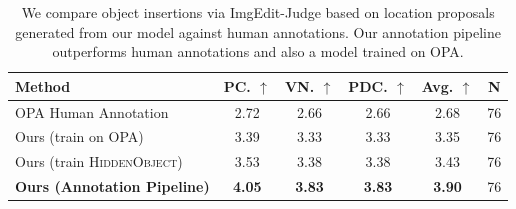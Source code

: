 
\begin{table}[t]
\label{tab:inpainting_performance}
\centering
\caption{We compare object insertions via ImgEdit-Judge based on location proposals generated from our model against human annotations. Our annotation pipeline outperforms human annotations and also a model trained on OPA.}
\label{tab:results_opa_short}
\begin{tabular}{@{}lccccc@{}}
\toprule
\textbf{Method} & \textbf{PC. $\uparrow$} & \textbf{VN. $\uparrow$} & \textbf{PDC. $\uparrow$} & \textbf{Avg. $\uparrow$} & \textbf{N} \\ 
\midrule
OPA Human Annotation & 2.72 & 2.66 & 2.66 & 2.68 & 76 \\ 
\midrule
Ours (train on OPA) & 3.39 & 3.33 & 3.33 & 3.35 & 76 \\
Ours (train \textsc{HiddenObject})  & 3.53 & 3.38 & 3.38 & 3.43 & 76 \\
\textbf{Ours (Annotation Pipeline)} & \textbf{4.05} & \textbf{3.83} & \textbf{3.83} & \textbf{3.90} & 76 \\ 
\bottomrule
\end{tabular}
\end{table}




